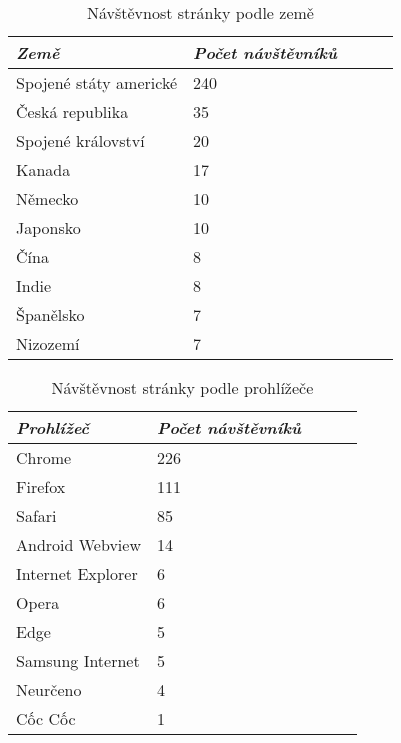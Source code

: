 \documentclass[a4paper, 12pt]{article}
\newcommand{\ra}[1]{\renewcommand{\arraystretch}{#1}} %
\begin{document}
  \vspace{-0.5\parskip}
  \begin{minipage}[b]{0.475\textwidth}
    \begin{table}[H]
      \caption{Návštěvnost stránky podle země}
      \label{tab:Návštěvnost stránky podle země}
      \footnotesize
      \centering
      \ra{1.3}
      \begin{tabular}{*5l}
        \toprule
        \emph{Země} & \emph{Počet návštěvníků} \\
        \midrule
        Spojené státy americké & 240 \\
        Česká republika	       & 35 \\
        Spojené království     & 20 \\
        Kanada                 & 17 \\
        Německo                & 10 \\
        Japonsko               & 10 \\
        Čína                   & 8 \\
        Indie                  & 8 \\
        Španělsko              & 7 \\
        Nizozemí               & 7 \\
        \bottomrule
      \end{tabular}
    \end{table}
  \end{minipage}\hfill
  \begin{minipage}[b]{0.475\textwidth}
    \begin{table}[H]
      \caption{Návštěvnost stránky podle prohlížeče}
      \label{tab:Návštěvnost stránky podle prohlížeče}
      \footnotesize
      \centering
      \ra{1.3}
      \begin{tabular}{*5l}
        \toprule
        \emph{Prohlížeč} & \emph{Počet návštěvníků} \\
        \midrule
        Chrome            & 226 \\
        Firefox	          & 111 \\
        Safari            & 85 \\
        Android Webview   & 14 \\
        Internet Explorer & 6 \\
        Opera             & 6 \\
        Edge              & 5 \\
        Samsung Internet  & 5 \\
        Neurčeno          & 4 \\
        Cốc Cốc           & 1 \\
        \bottomrule
      \end{tabular}
    \end{table}
  \end{minipage}
\end{document}
